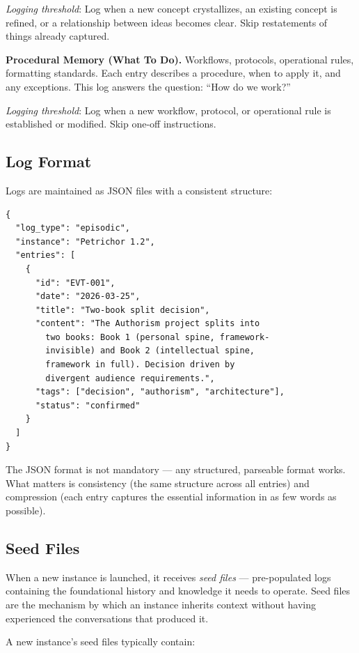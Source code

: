 \documentclass[11pt,a4paper]{article}
\begin{document}
\textit{Logging threshold}: Log when a new concept crystallizes, an existing concept is refined, or a relationship between ideas becomes clear. Skip restatements of things already captured.

\textbf{Procedural Memory (What To Do).} Workflows, protocols, operational rules, formatting standards. Each entry describes a procedure, when to apply it, and any exceptions. This log answers the question: ``How do we work?''

\textit{Logging threshold}: Log when a new workflow, protocol, or operational rule is established or modified. Skip one-off instructions.

\subsection{Log Format}

Logs are maintained as JSON files with a consistent structure:

\begin{lstlisting}
{
  "log_type": "episodic",
  "instance": "Petrichor 1.2",
  "entries": [
    {
      "id": "EVT-001",
      "date": "2026-03-25",
      "title": "Two-book split decision",
      "content": "The Authorism project splits into
        two books: Book 1 (personal spine, framework-
        invisible) and Book 2 (intellectual spine,
        framework in full). Decision driven by
        divergent audience requirements.",
      "tags": ["decision", "authorism", "architecture"],
      "status": "confirmed"
    }
  ]
}
\end{lstlisting}

The JSON format is not mandatory --- any structured, parseable format works. What matters is consistency (the same structure across all entries) and compression (each entry captures the essential information in as few words as possible).

\subsection{Seed Files}

When a new instance is launched, it receives \textit{seed files} --- pre-populated logs containing the foundational history and knowledge it needs to operate. Seed files are the mechanism by which an instance inherits context without having experienced the conversations that produced it.

A new instance's seed files typically contain:
\end{document}
